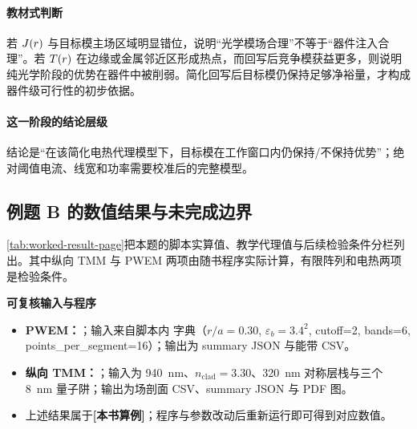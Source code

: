 \paragraph{教材式判断}
若 $J(r)$ 与目标模主场区域明显错位，说明“光学模场合理”不等于“器件注入合理”。若 $T(r)$ 在边缘或金属邻近区形成热点，而回写后竞争模获益更多，则说明纯光学阶段的优势在器件中被削弱。简化回写后目标模仍保持足够净裕量，才构成器件级可行性的初步依据。

\paragraph{这一阶段的结论层级}
结论是“在该简化电热代理模型下，目标模在工作窗口内仍保持/不保持优势”；绝对阈值电流、线宽和功率需要校准后的完整模型。

\subsection{例题 B 的数值结果与未完成边界}
\cref{tab:worked-result-page}把本题的脚本实算值、教学代理值与后续检验条件分栏列出。其中纵向 TMM 与 PWEM 两项由随书程序实际计算，有限阵列和电热两项是检验条件。

\begin{ReportingStandardBox}
\textbf{可复核输入与程序}
\begin{itemize}
  \item \textbf{PWEM：}；输入来自脚本内  字典（$r/a=0.30$, $\varepsilon_b=3.4^2$, cutoff=2, bands=6, points\_per\_segment=16）；输出为 summary JSON 与能带 CSV。
  \item \textbf{纵向 TMM：}；输入为 \SI{940}{nm}、$n_{\mathrm{clad}}=3.30$、\SI{320}{nm} 对称层栈与三个 \SI{8}{nm} 量子阱；输出为场剖面 CSV、summary JSON 与 PDF 图。
  \item 上述结果属于\textbf{[本书算例]}；程序与参数改动后重新运行即可得到对应数值。
\end{itemize}
\end{ReportingStandardBox}

